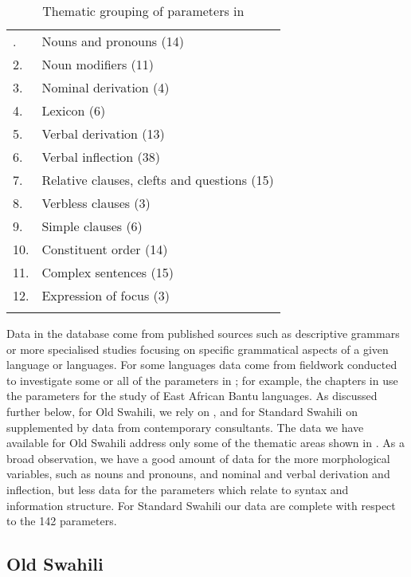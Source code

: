 \documentclass[output=paper]{langscibook}
\begin{document}
\begin{table}
\begin{tabular}{ll}
\lsptoprule
1.  &  Nouns and pronouns (14)\\
2.  &   Noun modifiers (11)\\
3.  &  Nominal derivation (4)\\
4.  &  Lexicon (6)\\
5.  &  Verbal derivation (13)\\
6.  &  Verbal inflection (38)\\
7.  &  Relative clauses, clefts and questions (15)\\
8.  &  Verbless clauses (3)\\
9.  &  Simple clauses (6)\\
10. & Constituent order (14)\\
11. & Complex sentences (15)\\
12. & Expression of focus (3)\\
\lspbottomrule
\end{tabular}
\caption{\label{tab:marten:1} Thematic grouping of parameters in \citet{GuéroisEtAl2017}}
\end{table}

Data in the database come from published sources such as descriptive grammars or more specialised studies focusing on specific grammatical aspects of a given language or languages. For some languages data come from fieldwork conducted to investigate some or all of the parameters in \citet{GuéroisEtAl2017}; for example, the chapters in \citet{ShinagawaAbe2019} use the parameters for the study of East African Bantu languages. As discussed further below, for Old Swahili, we rely on \citet{Miehe1979}, and for Standard Swahili on \citet{Ashton1947} supplemented by data from contemporary consultants. The data we have available for Old Swahili address only some of the thematic areas shown in . As a broad observation, we have a good amount of data for the more morphological variables, such as nouns and pronouns, and nominal and verbal derivation and inflection, but less data for the parameters which relate to syntax and information structure. For Standard Swahili our data are complete with respect to the 142 parameters. 

\subsection{Old Swahili}\label{sec:marten:2.2}
\end{document}
